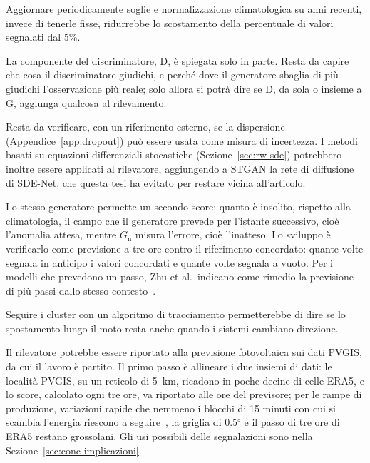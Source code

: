 Aggiornare periodicamente soglie e normalizzazione climatologica su anni recenti, invece di tenerle fisse, ridurrebbe lo scostamento della percentuale di valori segnalati dal 5\%.

La componente del discriminatore, D, è spiegata solo in parte. Resta da capire che cosa il discriminatore giudichi, e perché dove il generatore sbaglia di più giudichi l'osservazione più reale; solo allora si potrà dire se D, da sola o insieme a G, aggiunga qualcosa al rilevamento.

Resta da verificare, con un riferimento esterno, se la dispersione (Appendice~\ref{app:dropout}) può essere usata come misura di incertezza. I metodi basati su equazioni differenziali stocastiche (Sezione~\ref{sec:rw-sde}) potrebbero inoltre essere applicati al rilevatore, aggiungendo a STGAN la rete di diffusione di SDE-Net, che questa tesi ha evitato per restare vicina all'articolo.

Lo stesso generatore permette un secondo score: quanto è insolito, rispetto alla climatologia, il campo che il generatore prevede per l'istante successivo, cioè l'anomalia attesa, mentre $G_{\mathrm{n}}$ misura l'errore, cioè l'inatteso. Lo sviluppo è verificarlo come previsione a tre ore contro il riferimento concordato: quante volte segnala in anticipo i valori concordati e quante volte segnala a vuoto. Per i modelli che prevedono un passo, Zhu et al.\ indicano come rimedio la previsione di più passi dallo stesso contesto~\cite{zhu2026oneliners}.

Seguire i cluster con un algoritmo di tracciamento permetterebbe di dire se lo spostamento lungo il moto resta anche quando i sistemi cambiano direzione.

Il rilevatore potrebbe essere riportato alla previsione fotovoltaica sui dati PVGIS, da cui il lavoro è partito. Il primo passo è allineare i due insiemi di dati: le località PVGIS, su un reticolo di 5~km, ricadono in poche decine di celle ERA5, e lo score, calcolato ogni tre ore, va riportato alle ore del previsore; per le rampe di produzione, variazioni rapide che nemmeno i blocchi di 15 minuti con cui si scambia l'energia riescono a seguire~\cite{antonanzas2016review}, la griglia di 0.5$^\circ$ e il passo di tre ore di ERA5 restano grossolani. Gli usi possibili delle segnalazioni sono nella Sezione~\ref{sec:conc-implicazioni}.

